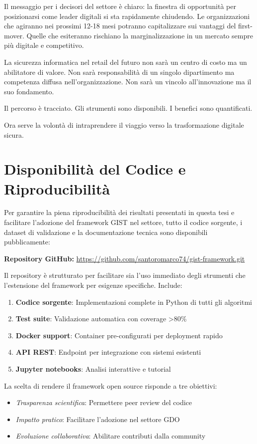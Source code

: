 Il messaggio per i decisori del settore è chiaro: la finestra di opportunità per posizionarsi come leader digitali si sta rapidamente chiudendo. Le organizzazioni che agiranno nei prossimi 12-18 mesi potranno capitalizzare sui vantaggi del first-mover. Quelle che esiteranno rischiano la marginalizzazione in un mercato sempre più digitale e competitivo.

La sicurezza informatica nel retail del futuro non sarà un centro di costo ma un abilitatore di valore. Non sarà responsabilità di un singolo dipartimento ma competenza diffusa nell'organizzazione. Non sarà un vincolo all'innovazione ma il suo fondamento.

Il percorso è tracciato. Gli strumenti sono disponibili. I benefici sono quantificati. 

Ora serve la volontà di intraprendere il viaggio verso la trasformazione digitale sicura.

\section*{Disponibilità del Codice e Riproducibilità}

Per garantire la piena riproducibilità dei risultati presentati in questa tesi e facilitare l'adozione del framework GIST nel settore, tutto il codice sorgente, i dataset di validazione e la documentazione tecnica sono disponibili pubblicamente:

\begin{center}
\large
\textbf{Repository GitHub:} \url{https://github.com/santoromarco74/gist-framework.git}
\end{center}

Il repository è strutturato per facilitare sia l'uso immediato degli strumenti che l'estensione del framework per esigenze specifiche. Include:

\begin{enumerate}
    \item \textbf{Codice sorgente}: Implementazioni complete in Python di tutti gli algoritmi
    \item \textbf{Test suite}: Validazione automatica con coverage >80\%
    \item \textbf{Docker support}: Container pre-configurati per deployment rapido
    \item \textbf{API REST}: Endpoint per integrazione con sistemi esistenti
    \item \textbf{Jupyter notebooks}: Analisi interattive e tutorial
\end{enumerate}

La scelta di rendere il framework open source risponde a tre obiettivi:
\begin{itemize}
    \item \textit{Trasparenza scientifica}: Permettere peer review del codice
    \item \textit{Impatto pratico}: Facilitare l'adozione nel settore GDO
    \item \textit{Evoluzione collaborativa}: Abilitare contributi dalla community
\end{itemize}
